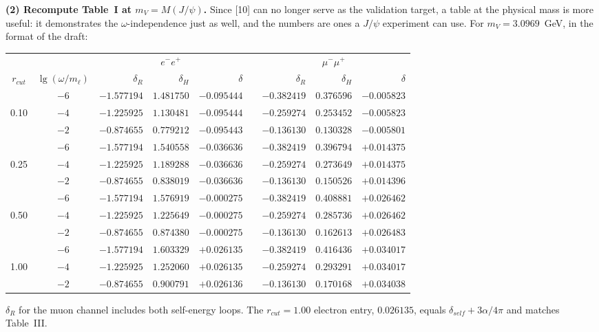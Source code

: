 \documentclass[11pt]{article}
\begin{document}
\textbf{(2) Recompute Table~I at $m_V=M(J/\psi)$.} Since [10] can no longer serve
as the validation target, a table at the physical mass is more useful: it
demonstrates the $\omega$-independence just as well, and the numbers are ones a
$J/\psi$ experiment can use. For $m_V=3.0969$~GeV, in the format of the draft:

\begin{center}
\begin{tabular}{cc rrr c rrr}
\toprule
& & \multicolumn{3}{c}{$e^-e^+$} & & \multicolumn{3}{c}{$\mu^-\mu^+$}\\
\cmidrule(lr){3-5}\cmidrule(lr){7-9}
$r_{cut}$ & $\lg(\omega/m_\ell)$ & $\delta_R$ & $\delta_H$ & $\delta$ & &
$\delta_R$ & $\delta_H$ & $\delta$\\
\midrule
      & $-6$ & $-1.577194$ & $1.481750$ & $-0.095444$ & & $-0.382419$ & $0.376596$ & $-0.005823$\\
0.10  & $-4$ & $-1.225925$ & $1.130481$ & $-0.095444$ & & $-0.259274$ & $0.253452$ & $-0.005823$\\
      & $-2$ & $-0.874655$ & $0.779212$ & $-0.095443$ & & $-0.136130$ & $0.130328$ & $-0.005801$\\
\midrule
      & $-6$ & $-1.577194$ & $1.540558$ & $-0.036636$ & & $-0.382419$ & $0.396794$ & $+0.014375$\\
0.25  & $-4$ & $-1.225925$ & $1.189288$ & $-0.036636$ & & $-0.259274$ & $0.273649$ & $+0.014375$\\
      & $-2$ & $-0.874655$ & $0.838019$ & $-0.036636$ & & $-0.136130$ & $0.150526$ & $+0.014396$\\
\midrule
      & $-6$ & $-1.577194$ & $1.576919$ & $-0.000275$ & & $-0.382419$ & $0.408881$ & $+0.026462$\\
0.50  & $-4$ & $-1.225925$ & $1.225649$ & $-0.000275$ & & $-0.259274$ & $0.285736$ & $+0.026462$\\
      & $-2$ & $-0.874655$ & $0.874380$ & $-0.000275$ & & $-0.136130$ & $0.162613$ & $+0.026483$\\
\midrule
      & $-6$ & $-1.577194$ & $1.603329$ & $+0.026135$ & & $-0.382419$ & $0.416436$ & $+0.034017$\\
1.00  & $-4$ & $-1.225925$ & $1.252060$ & $+0.026135$ & & $-0.259274$ & $0.293291$ & $+0.034017$\\
      & $-2$ & $-0.874655$ & $0.900791$ & $+0.026136$ & & $-0.136130$ & $0.170168$ & $+0.034038$\\
\bottomrule
\end{tabular}
\end{center}
$\delta_R$ for the muon channel includes both self-energy loops. The
$r_{cut}=1.00$ electron entry, $0.026135$, equals $\delta_{self}+3\alpha/4\pi$
and matches Table~III.
\end{document}
